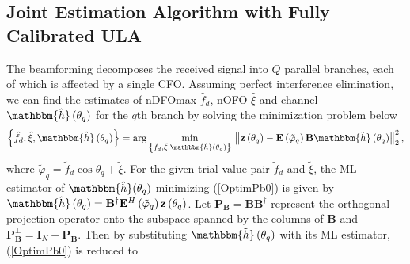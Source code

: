 \documentclass[12pt, draftclsnofoot, onecolumn]{IEEEtran}
\begin{document}
\vspace{-0.6em}
\subsection{Joint Estimation Algorithm with Fully Calibrated ULA}
The beamforming decomposes the received signal into $Q$ parallel branches, each of which is affected by a single CFO. Assuming perfect interference elimination, we can find the estimates of nDFOmax ${\hat{f}}_{d}$, nOFO $\hat{\xi }$ and channel $\mathbbm{\hat{h}}\left( \theta_{q}  \right)$ for the $q$th branch by solving the minimization problem below
\begin{align} \label{OptimPb0}
\left\{{\hat{f}}_{d}, \hat{\xi}, \mathbbm{\hat{h}}\left( \theta_{q}  \right)\right\} = \arg \underset{\left\{{\tilde{f}}_{d}, \tilde{\xi}, \mathbbm{\tilde{h}}\left( \theta_{q}  \right)\right\}}{\mathop{\min }}\,\left\| \mathbf{z}\left( \theta_{q}  \right)-\mathbf{E}\left( \tilde{\varphi}_{q} \right)\mathbf{B}\mathbbm{\tilde{h}} \left( \theta_{q}  \right) \right\|_{2}^{2},
\end{align}
where $\tilde{\varphi}_{q} = {{\tilde{f}}_{d}}\cos \theta_{q} + \tilde{\xi}$. For the given trial value pair ${{\tilde{f}}_{d}}$ and $\tilde{\xi }$, the ML estimator of $\mathbbm{\hat{h}}(\theta_{q})$ minimizing (\ref{OptimPb0}) is given by $\mathbbm{\hat{h}}\left( \theta_{q}  \right)={{\mathbf{B}}^{\dagger }}{{\mathbf{E}}^{H}}\left( \tilde{\varphi}_{q} \right)\mathbf{z}\left( \theta_{q}  \right)$. Let ${{\mathbf{P}}_{\mathbf{B}}}=\mathbf{B}{{\mathbf{B}}^{\dagger }}$ represent the orthogonal projection operator onto the subspace spanned by the columns of $\mathbf{B}$ and $\mathbf{P}_{\mathbf{B}}^{\bot }={{\mathbf{I}}_{N}}-{{\mathbf{P}}_{\mathbf{B}}}$. Then by substituting $\mathbbm{\tilde{h}}\left( \theta_{q}  \right)$ with its ML estimator, (\ref{OptimPb0}) is reduced to
%
\end{document}
